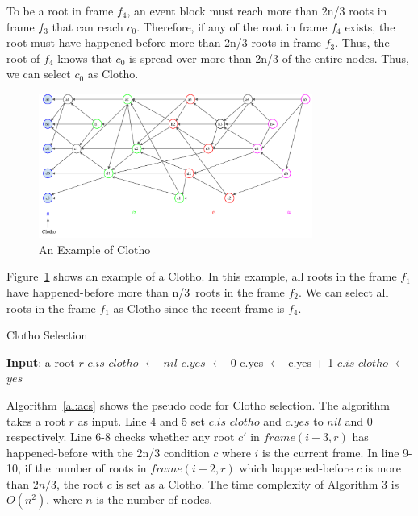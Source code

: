 \documentclass{article}
\begin{document}
To be a root in frame $f_4$, an event block must reach more than 2n/3 roots in frame $f_3$ that can reach $c_0$. Therefore, if any of the root in frame $f_4$ exists, the root must have happened-before more than 2n/3 roots in frame $f_3$. Thus, the root of $f_4$ knows that $c_0$ is spread over more than 2n/3 of the entire nodes. Thus, we can select $c_0$ as Clotho. 


\begin{figure}[H]\centering  
	\includegraphics[width=0.8\textwidth]{Clotho_fig1.pdf}
	\caption{An Example of Clotho}
	\label{fig:Clotho}
\end{figure}

Figure~\ref{fig:Clotho} shows an example of a Clotho. In this example, all roots in the frame $f_1$ have happened-before more than n/3 roots in the frame $f_2$. We can select all roots in the frame $f_1$ as Clotho since the recent frame is $f_4$. 

\begin{algorithm} [H]
\caption{Clotho Selection}\label{al:acs}
\begin{algorithmic}[1]
	\State \textbf{Input}: a root $r$
	\State$c.is\_clotho$ $\leftarrow$ $nil$ 
	\State$c.yes$ $\leftarrow$ 0
	\State c.yes $\leftarrow$ c.yes + 1
	\EndIf
	\EndFor
	\State $c.is\_clotho$ $\leftarrow$ $yes$
	\EndIf
	\EndFor
	\EndProcedure
\end{algorithmic}
\end{algorithm}

Algorithm~\ref{al:acs} shows the pseudo code for Clotho selection. The algorithm takes a root $r$ as input. 
Line 4 and 5 set $c.is\_clotho$ and $c.yes$ to $nil$ and 0 respectively. Line 6-8 checks whether any root $c'$ in $frame(i-3,r)$ has happened-before with the 2n/3 condition $c$ where $i$ is the current frame. In line 9-10, if the number of roots in $frame(i-2,r)$ which happened-before $c$ is more than $2n/3$, the root $c$ is set as a Clotho. The time complexity of Algorithm 3 is $O(n^{2})$, where $n$ is the number of nodes. 
\end{document}
